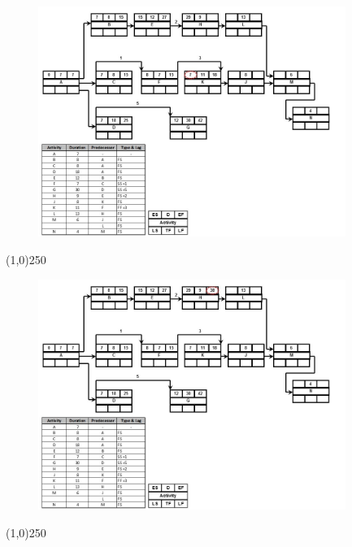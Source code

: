 \begin{frame}
\begin{figure}
	\centering
		\includegraphics[width = 10.0cm]{oldnotes/Slide210.jpg}
\end{figure}
\end{frame}
\begin{center}\line(1,0){250}\end{center}




\begin{frame}
\begin{figure}
	\centering
		\includegraphics[width = 10.0cm]{oldnotes/Slide211.jpg}
\end{figure}
\end{frame}
\begin{center}\line(1,0){250}\end{center}




